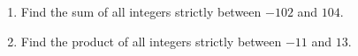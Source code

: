 \begin{enumerate}
\item[(a)] Find the sum of all integers strictly between $-102$ and $104$.
\item[(b)] Find the product of all integers strictly between $-11$ and $13$.
\end{enumerate}
